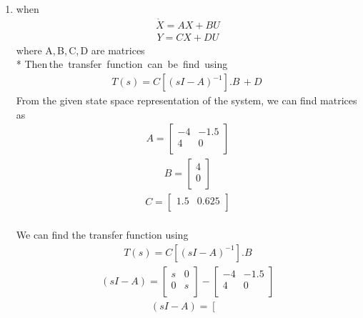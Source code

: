 \begin{enumerate}[label=\thesubsection.\arabic*.,ref=\thesubsection.\theenumi]
\item 
\solution
when
\begin{align}
    \dot{X} = AX + BU
\end{align}
\begin{align}
    Y = CX + DU
\end{align}
\vskip 0.1cm
where \; A,\,B,\,C,\,D \; are matrices 
  \\* Then\,the\, transfer\, function\, can\, be\, find\, using
\vskip 0.1cm
\begin{align}
    T(s) = C[(sI-A)^{-1}].B \,+ D\
\end{align}
\vskip 0.1cm
From the given state space representation of the system, we can find matrices as
\begin{align}
    A=
  \left[ {\begin{array}{cc}
   -4 & -1.5 \\
   4 & 0 \\
  \end{array} } \right]
\end{align}
\begin{align}
    B = \left[ {\begin{array}{cc}
      4 \\
      0 \\
  \end{array} }\right]
\end{align}
\begin{align}
     C = \left[ {\begin{array}{cc}
   1.5 & 0.625 \\
  \end{array} }\right]
\end{align}
\\We can find the transfer function using
\begin{align}
    T(s) = C[(sI - A)^{-1}].B
\end{align}
\begin{align}
    (sI - A) = \left[ {\begin{array}{cc}
   s & 0 \\
   0 & s \\
  \end{array} } \right] - \left[ {\begin{array}{cc}
   -4 & -1.5 \\
   4 & 0 \\
  \end{array} } \right]
\end{align}
\begin{align}
    (sI - A) = \left[ {\begin{array}{cc}

\end{array}}
\end{align}
\end{enumerate}
